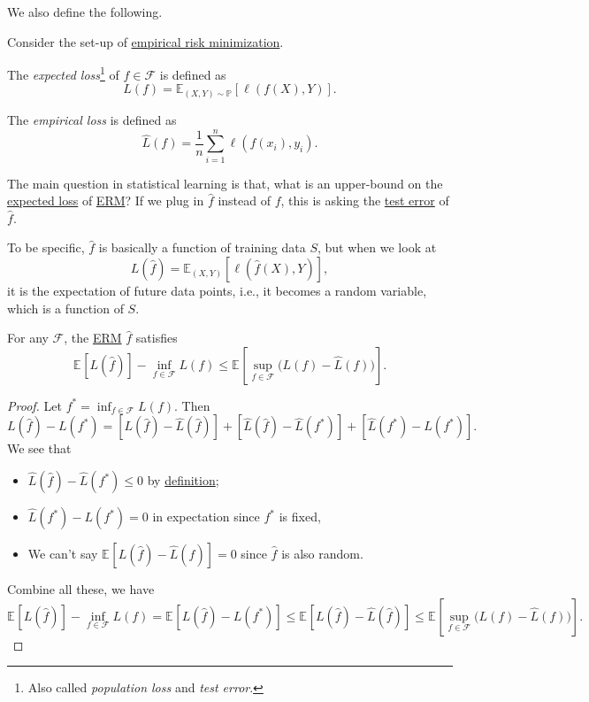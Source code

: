 We also define the following.

\begin{definition*}
	Consider the set-up of \hyperref[prb:ERM]{empirical risk minimization}.
	\begin{definition}\label{def:expected-loss}
		The \emph{expected loss}\footnote{Also called \emph{population loss} and \emph{test error}.} of \(f\in \mathscr{F} \) is defined as
		\[
			L(f) = \mathbb{E}_{(X, Y) \sim \mathbb{P} }\left[\ell (f(X), Y) \right].
		\]
	\end{definition}

	\begin{definition}\label{def:empirical-loss}
		The \emph{empirical loss} is defined as
		\[
			\hat{L} (f) = \frac{1}{n}\sum_{i=1}^{n} \ell (f(x_i), y_i).
		\]
	\end{definition}
\end{definition*}

The main question in statistical learning is that, what is an upper-bound on the \hyperref[def:expected-loss]{expected loss} of \hyperref[prb:ERM]{ERM}? If we plug in \(\hat{f} \) instead of \(f\), this is asking the \hyperref[def:expected-loss]{test error} of \(\hat{f} \).

To be specific, \(\hat{f} \) is basically a function of training data \(S\), but when we look at
\[
	L(\hat{f} ) = \mathbb{E}_{(X, Y)}\left[\ell (\hat{f} (X), Y) \right],
\]
it is the expectation of future data points, i.e., it becomes a random variable, which is a function of \(S\).

\begin{lemma}\label{lma:ERM}
	For any \(\mathscr{F} \), the \hyperref[prb:ERM]{ERM} \(\hat{f} \) satisfies
	\[
		\mathbb{E}_{}[L(\hat{f} ) ] - \inf _{f\in \mathscr{F} } L(f)
		\leq \mathbb{E}_{}\left[\sup _{f\in \mathscr{F} } \big(L(f) - \hat{L} (f) \big) \right] .
	\]
\end{lemma}
\begin{proof}
	Let \(f^{\ast} = \inf _{f\in \mathscr{F} } L(f)\). Then
	\[
		L(\hat{f} ) - L(f^{\ast} )
		= [L(\hat{f} ) - \hat{L} (\hat{f} )] + [\hat{L} (\hat{f} ) - \hat{L} (f^{\ast} )] + [\hat{L} (f^{\ast} ) - L(f^{\ast} )].
	\]
	We see that
	\begin{itemize}
		\item \(\hat{L} (\hat{f} ) - \hat{L} (f^{\ast} ) \leq 0\) by \hyperref[prb:ERM]{definition};
		\item \(\hat{L} (f^{\ast} ) - L(f^{\ast} ) = 0\) in expectation since \(f^{\ast} \) is fixed,
		\item We can't say \(\mathbb{E}_{}[L(\hat{f} ) - \hat{L} (\hat{f} ) ] = 0\) since \(\hat{f} \) is also random.
	\end{itemize}
	Combine all these, we have
	\[
		\mathbb{E}_{}[L(\hat{f} ) ] - \inf _{f\in \mathscr{F} } L(f)
		= \mathbb{E}_{}[ L(\hat{f} ) - L(f^{\ast} ) ]
		\leq \mathbb{E}_{}[ L(\hat{f} ) - \hat{L} (\hat{f} ) ]
		\leq \mathbb{E}_{}\left[ \sup _{f\in \mathscr{F} } \big(L(f) - \hat{L} (f) \big) \right].
	\]
\end{proof}

